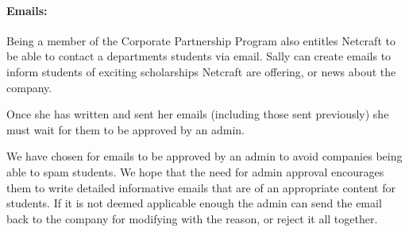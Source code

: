  \paragraph{Emails:}
    Being a member of the Corporate Partnership Program also entitles Netcraft to be able to contact a departments students via email. Sally can create emails to inform students of exciting scholarships Netcraft are offering, or news about the company.

    Once she has written and sent her emails (including those sent previously) she must wait for them to be approved by an admin.

    We have chosen for emails to be approved by an admin to avoid companies being able to spam students. We hope that the need for admin approval encourages them to write detailed informative emails that are of an appropriate content for students. If it is not deemed applicable enough the admin can send the email back to the company for modifying with the reason, or reject it all together.

